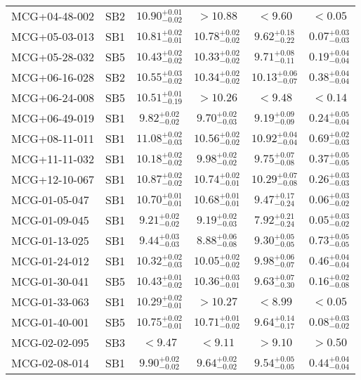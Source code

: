 \documentclass[onecolumn]{mn2e}
\begin{document}
{\begin{center}
\begin{longtable}{lccccc}
MCG+04-48-002 & SB2 & $10.90_{-0.02}^{+0.01}$ & $>10.88$ & $<9.60$ &$<0.05$ \\
MCG+05-03-013 & SB1 & $10.81_{-0.01}^{+0.02}$ & $10.78_{-0.02}^{+0.02}$ & $9.62_{-0.22}^{+0.18}$ &$0.07_{-0.03}^{+0.03}$ \\
MCG+05-28-032 & SB5 & $10.43_{-0.02}^{+0.02}$ & $10.33_{-0.02}^{+0.02}$ & $9.71_{-0.11}^{+0.08}$ &$0.19_{-0.04}^{+0.04}$ \\
MCG+06-16-028 & SB2 & $10.55_{-0.02}^{+0.03}$ & $10.34_{-0.02}^{+0.02}$ & $10.13_{-0.07}^{+0.06}$ &$0.38_{-0.04}^{+0.04}$ \\
MCG+06-24-008 & SB5 & $10.51_{-0.19}^{+0.01}$ & $>10.26$ & $<9.48$ &$<0.14$ \\
MCG+06-49-019 & SB1 & $9.82_{-0.02}^{+0.02}$ & $9.70_{-0.03}^{+0.02}$ & $9.19_{-0.09}^{+0.09}$ &$0.24_{-0.04}^{+0.05}$ \\
MCG+08-11-011 & SB1 & $11.08_{-0.03}^{+0.02}$ & $10.56_{-0.02}^{+0.02}$ & $10.92_{-0.04}^{+0.04}$ &$0.69_{-0.03}^{+0.02}$ \\
MCG+11-11-032 & SB1 & $10.18_{-0.02}^{+0.02}$ & $9.98_{-0.02}^{+0.02}$ & $9.75_{-0.08}^{+0.07}$ &$0.37_{-0.05}^{+0.05}$ \\
MCG+12-10-067 & SB1 & $10.87_{-0.02}^{+0.02}$ & $10.74_{-0.01}^{+0.02}$ & $10.29_{-0.08}^{+0.07}$ &$0.26_{-0.03}^{+0.03}$ \\
MCG-01-05-047 & SB1 & $10.70_{-0.01}^{+0.01}$ & $10.68_{-0.01}^{+0.01}$ & $9.47_{-0.24}^{+0.17}$ &$0.06_{-0.02}^{+0.03}$ \\
MCG-01-09-045 & SB1 & $9.21_{-0.02}^{+0.02}$ & $9.19_{-0.03}^{+0.02}$ & $7.92_{-0.24}^{+0.21}$ &$0.05_{-0.02}^{+0.03}$ \\
MCG-01-13-025 & SB1 & $9.44_{-0.03}^{+0.03}$ & $8.88_{-0.08}^{+0.06}$ & $9.30_{-0.05}^{+0.05}$ &$0.73_{-0.05}^{+0.05}$ \\
MCG-01-24-012 & SB1 & $10.32_{-0.03}^{+0.02}$ & $10.05_{-0.02}^{+0.02}$ & $9.98_{-0.07}^{+0.06}$ &$0.46_{-0.04}^{+0.04}$ \\
MCG-01-30-041 & SB5 & $10.43_{-0.02}^{+0.01}$ & $10.36_{-0.01}^{+0.03}$ & $9.63_{-0.30}^{+0.07}$ &$0.16_{-0.08}^{+0.02}$ \\
MCG-01-33-063 & SB1 & $10.29_{-0.01}^{+0.02}$ & $>10.27$ & $<8.99$ &$<0.05$ \\
MCG-01-40-001 & SB5 & $10.75_{-0.01}^{+0.02}$ & $10.71_{-0.02}^{+0.01}$ & $9.64_{-0.17}^{+0.14}$ &$0.08_{-0.02}^{+0.03}$ \\
MCG-02-02-095 & SB3 & $<9.47$ & $<9.11$ & $>9.10$ &$>0.50$ \\
MCG-02-08-014 & SB1 & $9.90_{-0.02}^{+0.02}$ & $9.64_{-0.02}^{+0.02}$ & $9.54_{-0.05}^{+0.05}$ &$0.44_{-0.04}^{+0.04}$ \\

\end{longtable}
\end{center}}
\end{document}
